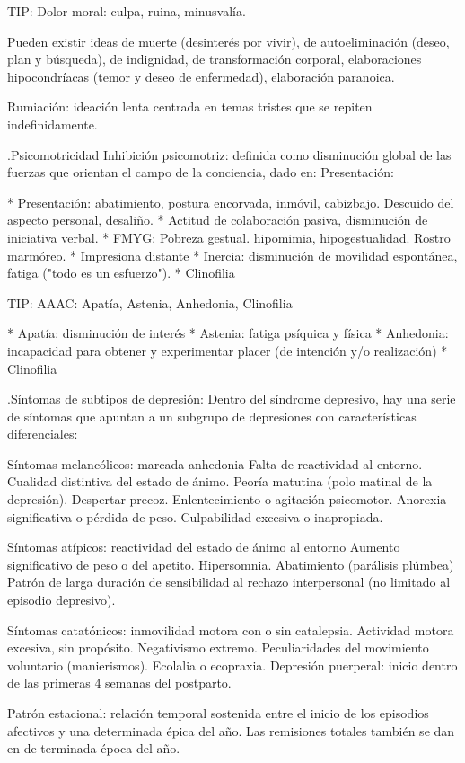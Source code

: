 TIP: Dolor moral: culpa, ruina, minusvalía.

Pueden existir ideas de muerte (desinterés por vivir), de autoeliminación (deseo, plan y búsqueda), de indignidad, de transformación corporal, elaboraciones hipocondríacas (temor y deseo de enfermedad), elaboración paranoica.

Rumiación: ideación lenta centrada en temas tristes que se repiten indefinidamente.

.Psicomotricidad
Inhibición psicomotriz: definida como disminución global de las fuerzas que orientan el campo de la conciencia, dado en: Presentación:

* Presentación: abatimiento, postura encorvada, inmóvil, cabizbajo. Descuido del aspecto personal, desaliño.
* Actitud de colaboración pasiva, disminución de iniciativa verbal.
* FMYG: Pobreza gestual. hipomimia, hipogestualidad. Rostro marmóreo.
* Impresiona distante
* Inercia: disminución de movilidad espontánea, fatiga ("todo es un esfuerzo").
* Clinofilia

TIP: AAAC: Apatía, Astenia, Anhedonia, Clinofilia

* Apatía: disminución de interés
* Astenia: fatiga psíquica y física
* Anhedonia: incapacidad para obtener y experimentar placer (de intención y/o realización)
* Clinofilia

.Síntomas de subtipos de depresión:
Dentro del síndrome depresivo, hay una serie de síntomas que apuntan a un subgrupo de depresiones con características diferenciales:

Síntomas melancólicos: marcada anhedonia Falta de reactividad al entorno. Cualidad distintiva del estado de ánimo. Peoría matutina (polo matinal de la depresión). Despertar precoz. Enlentecimiento o agitación psicomotor. Anorexia significativa o pérdida de peso. Culpabilidad excesiva o inapropiada.

Síntomas atípicos: reactividad del estado de ánimo al entorno Aumento significativo de peso o del apetito. Hipersomnia. Abatimiento (parálisis plúmbea) Patrón de larga duración de sensibilidad al rechazo interpersonal (no limitado al episodio depresivo).

Síntomas catatónicos: inmovilidad motora con o sin catalepsia. Actividad motora excesiva, sin propósito. Negativismo extremo. Peculiaridades del movimiento voluntario (manierismos). Ecolalia o ecopraxia. Depresión puerperal: inicio dentro de las primeras 4 semanas del postparto.

Patrón estacional: relación temporal sostenida entre el inicio de los episodios afectivos y una determinada épica del año. Las remisiones totales también se dan en de-terminada época del año.

